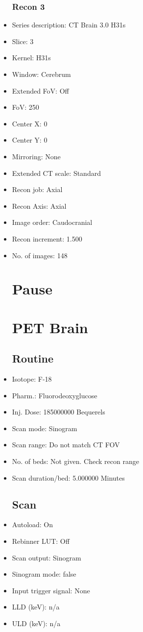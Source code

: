 \documentclass[12pt]{article}
\begin{document}
\begin{itemize}
\subsubsection{Recon 3}
\item Series description: CT Brain 3.0 H31s
\item Slice: 3
\item Kernel: H31s
\item Window: Cerebrum
\item Extended FoV: Off
\item FoV: 250
\item Center X: 0
\item Center Y: 0
\item Mirroring: None
\item Extended CT scale: Standard
\item Recon job: Axial
\item Recon Axis: Axial
\item Image order: Caudocranial
\item Recon increment: 1.500
\item No. of images: 148
\section{Pause}
\section{PET Brain}\subsection{Routine}
\item Isotope: F-18
\item Pharm.: Fluorodeoxyglucose
\item Inj. Dose: 185000000 Bequerels
\item Scan mode: Sinogram
\item Scan range: Do not match CT FOV
\item No. of beds: Not given. Check recon range
\item Scan duration/bed: 5.000000 Minutes
\subsection{Scan}
\item Autoload: On
\item Rebinner LUT: Off
\item Scan output: Sinogram
\item Sinogram mode: false
\item Input trigger signal: None
\item LLD (keV): n/a
\item ULD (keV): n/a

\end{itemize}
\end{document}
